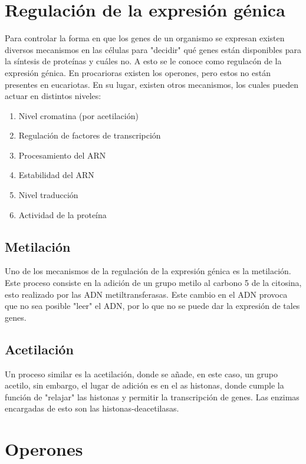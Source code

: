 \section{Regulación de la expresión génica}

Para controlar la forma en que los genes de un organismo se expresan existen diversos mecanismos en las células para "decidir" qué genes están disponibles para la síntesis de proteínas y cuáles no. A esto se le conoce como regulacón de la expresión génica.
En procarioras existen los operones, pero estos no están presentes en eucariotas. En su lugar, existen otros mecanismos, los cuales pueden actuar en distintos niveles:

\begin{enumerate}
    \item Nivel cromatina (por acetilación)
    \item Regulación de factores de transcripción
    \item Procesamiento del ARN
    \item Estabilidad del ARN
    \item Nivel traducción
    \item Actividad de la proteína
\end{enumerate}

\subsection{Metilación}

Uno de los mecanismos de la regulación de la expresión génica es la metilación. Este proceso consiste en la adición de un grupo metilo al carbono 5 de la citosina, esto realizado por las ADN metiltransferasas. Este cambio en el ADN  provoca  que no sea posible "leer" el ADN, por lo que no se puede dar la expresión de tales genes.

\subsection{Acetilación}

Un proceso similar es la acetilación, donde se añade, en este caso, un grupo acetilo, sin embargo, el lugar de adición es en el as histonas, donde cumple la función de "relajar" las histonas y permitir la transcripción de genes. Las enzimas encargadas de esto son las histonas-deacetilasas.

\section{Operones}

